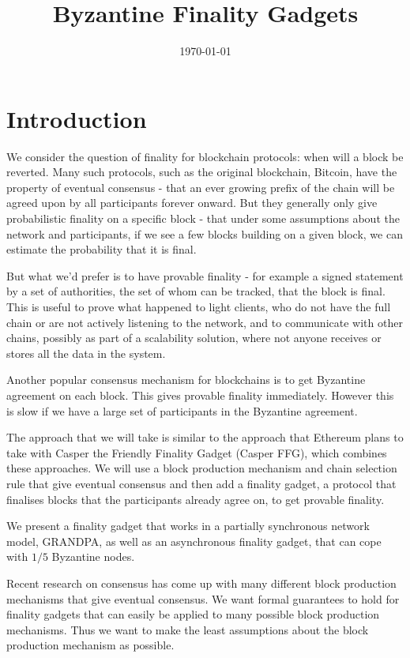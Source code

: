 \documentclass{article}
\begin{document}
\title{Byzantine Finality Gadgets}
\date{\today}
\maketitle

\section{Introduction}

We consider the question of finality for blockchain protocols: when will a block be reverted. Many such protocols, such as the original blockchain, Bitcoin, have the property of eventual consensus - that an ever growing prefix of the chain will be agreed upon by all participants forever onward.
But they generally only give probabilistic finality on a specific block - that under some assumptions about the network and participants, if we see a few blocks building on a given block, we can estimate the probability that it is final.

But what we'd prefer is to have provable finality - for example a signed statement by a set of authorities, the set of whom can be tracked, that the block is final.
This is useful to prove what happened to light clients, who do not have the full chain or are not actively listening to the network, and to communicate with other chains, possibly as part of a scalability solution, where not anyone receives or stores all the data in the system. 

Another popular consensus mechanism for blockchains is to get Byzantine agreement on each block.
This gives provable finality immediately. However this is slow if we have a large set of participants in the Byzantine agreement.

The approach that we will take is similar to the approach that Ethereum plans to take with Casper the Friendly Finality Gadget (Casper FFG)\cite{CasperFFG}, which combines these approaches.
We will use a block production mechanism and chain selection rule that give eventual consensus and then add a finality gadget, a protocol that finalises blocks that the participants already agree on, to get provable finality.

We present a finality gadget that works in a partially synchronous network model, GRANDPA, as well as an asynchronous finality gadget, that can cope with $1/5$ Byzantine nodes. 

Recent research on consensus has come up with many different block production mechanisms that give eventual consensus. We want formal guarantees to hold for finality gadgets that can easily be applied to many possible block production mechanisms. Thus we want to make the least assumptions about the block production mechanism as possible.
\end{document}
